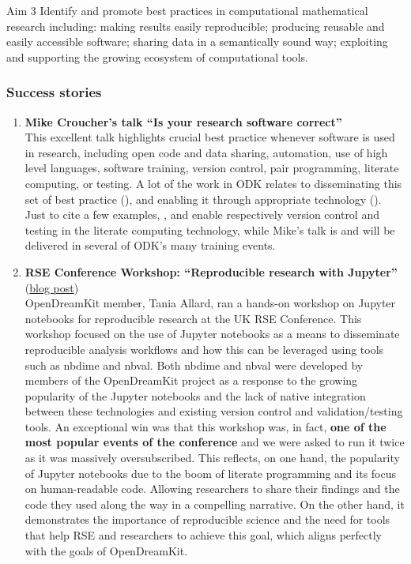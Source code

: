 \begin{recommendation}{Aim 3}
  Identify and promote best practices in computational mathematical research including: making results easily reproducible; producing
  reusable and easily accessible software; sharing data in a semantically sound way; exploiting and supporting the growing
  ecosystem of computational tools.
\end{recommendation}

\subsubsection{Success stories}

\begin{enumerate}
\item \textbf{Mike Croucher's talk ``Is your research software correct''}\\
  This excellent talk highlights crucial best practice whenever
  software is used in research, including open code and data sharing,
  automation, use of high level languages, software training, version
  control, pair programming, literate computing, or testing. A lot of
  the work in ODK relates to disseminating this set of best practice
  (), and enabling it through appropriate technology
  (). Just to cite a few examples,
  , and
   enable respectively version control
  and testing in the \Jupyter literate computing technology, while
  Mike's talk is and will be delivered in several of ODK's many
  training events.

\item \textbf{RSE Conference Workshop: ``Reproducible research with Jupyter''}
  (\href{https://opendreamkit.org/2018/03/07/opendreamkit-at-the-rse-conference/}{blog post})\\
  OpenDreamKit member, Tania Allard, ran a hands-on workshop on
  Jupyter notebooks for reproducible research at the UK RSE
  Conference. This workshop focused on the use of Jupyter notebooks as
  a means to disseminate reproducible analysis workflows and how this
  can be leveraged using tools such as nbdime and nbval. Both nbdime
  and nbval were developed by members of the OpenDreamKit project as a
  response to the growing popularity of the Jupyter notebooks and the
  lack of native integration between these technologies and existing
  version control and validation/testing tools. An exceptional win was
  that this workshop was, in fact, \textbf{one of the most popular events of
  the conference} and we were asked to run it twice as it was massively
  oversubscribed. This reflects, on one hand, the popularity of
  Jupyter notebooks due to the boom of literate programming and its
  focus on human-readable code. Allowing researchers to share their
  findings and the code they used along the way in a compelling
  narrative. On the other hand, it demonstrates the importance of
  reproducible science and the need for tools that help RSE and
  researchers to achieve this goal, which aligns perfectly with the
  goals of OpenDreamKit.


\end{enumerate}
